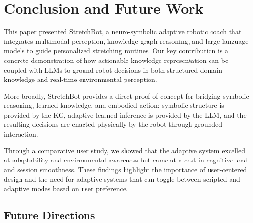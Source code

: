 \section{Conclusion and Future Work}
\label{sec:conclusion}

This paper presented StretchBot, a neuro-symbolic adaptive robotic coach that integrates multimodal perception, knowledge graph reasoning, and large language models to guide personalized stretching routines. Our key contribution is a concrete demonstration of how actionable knowledge representation can be coupled with LLMs to ground robot decisions in both structured domain knowledge and real-time environmental perception.

More broadly, StretchBot provides a direct proof-of-concept for bridging symbolic reasoning, learned knowledge, and embodied action: symbolic structure is provided by the KG, adaptive learned inference is provided by the LLM, and the resulting decisions are enacted physically by the robot through grounded interaction.

Through a comparative user study, we showed that the adaptive system excelled at adaptability and environmental awareness but came at a cost in cognitive load and session smoothness. These findings highlight the importance of user-centered design and the need for adaptive systems that can toggle between scripted and adaptive modes based on user preference.

\subsection{Future Directions}

